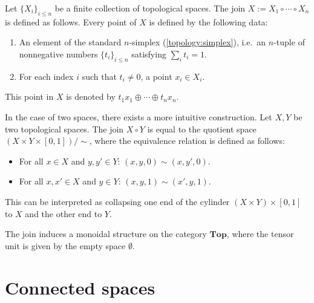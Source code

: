     \begin{construct}[Join]\label{topology:join}
        Let $\{X_i\}_{i\leq n}$ be a finite collection of topological spaces. The join $X:=X_1\circ\cdots\circ X_n$ is defined as follows. Every point of $X$ is defined by the following data:
        \begin{enumerate}
            \item An element of the standard $n$-simplex (\cref{topology:simplex}), i.e.~an $n$-tuple of nonnegative numbers $\{t_i\}_{i\leq n}$ satisfying $\sum_it_i=1$.
            \item For each index $i$ such that $t_i\neq 0$, a point $x_i\in X_i$.
        \end{enumerate}
        This point in $X$ is denoted by $t_1x_1\oplus\cdots\oplus t_nx_n$.

        In the case of two spaces, there exists a more intuitive construction. Let $X,Y$ be two topological spaces. The join $X\circ Y$ is equal to the quotient space $(X\times Y\times[0,1])/\sim$, where the equivalence relation is defined as follows:
        \begin{itemize}
            \item For all $x\in X$ and $y,y'\in Y$: $(x,y,0)\sim(x,y',0)$.
            \item For all $x,x'\in X$ and $y\in Y$: $(x,y,1)\sim(x',y,1)$.
        \end{itemize}
        This can be interpreted as collapsing one end of the cylinder $(X\times Y)\times[0,1]$ to $X$ and the other end to $Y$.
    \end{construct}
    \begin{property}
        The join induces a monoidal structure on the category $\mathbf{Top}$, where the tensor unit is given by the empty space $\emptyset$.
    \end{property}


\section{Connected spaces}

